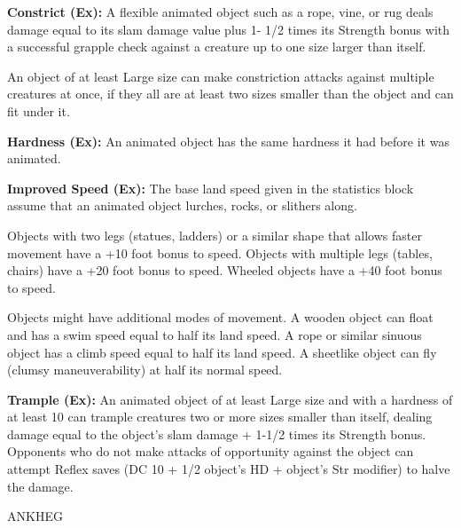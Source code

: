 \documentclass{article}
\begin{document}
\textbf{Constrict (Ex): }A flexible animated object such as a rope, vine, or rug 
deals damage equal to its slam damage value plus 1- 1/2 times its Strength bonus 
with a successful grapple check against a creature up to one size larger than itself.

An object of at least Large size can make constriction attacks against multiple 
creatures at once, if they all are at least two sizes smaller than the object and 
can fit under it.

\textbf{Hardness (Ex): }An animated object has the same hardness it had before 
it was animated.

\textbf{Improved Speed (Ex):} The base land speed given in the statistics block 
assume that an animated object lurches, rocks, or slithers along.

Objects with two legs (statues, ladders) or a similar shape that allows faster 
movement have a +10 foot bonus to speed. Objects with multiple legs (tables, chairs) 
have a +20 foot bonus to speed. Wheeled objects have a +40 foot bonus to speed.

Objects might have additional modes of movement. A wooden object can float and 
has a swim speed equal to half its land speed. A rope or similar sinuous object 
has a climb speed equal to half its land speed. A sheetlike object can fly (clumsy 
maneuverability) at half its normal speed.

\textbf{Trample (Ex): }An animated object of at least Large size and with a hardness 
of at least 10 can trample creatures two or more sizes smaller than itself, dealing 
damage equal to the object's slam damage + 1-1/2 times its Strength bonus. Opponents 
who do not make attacks of opportunity against the object can attempt Reflex saves 
(DC 10 + 1/2 object's HD + object's Str modifier) to halve the damage.

\vspace{12pt}
{\LARGE{}ANKHEG}
\end{document}
